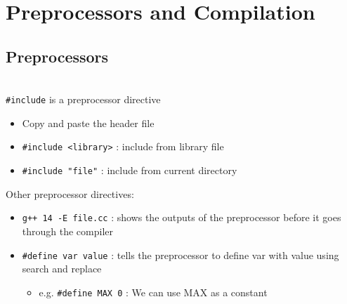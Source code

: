 \documentclass[12pt]{article}
\begin{document}
\section{Preprocessors and Compilation}
\subsection{Preprocessors}
\\
\lstinline{#include} is a preprocessor directive
\begin{itemize}
    \item Copy and paste the header file
    \item \lstinline{#include <library>} : include from library file
    \item \lstinline{#include "file"} : include from current directory
\end{itemize} 
Other preprocessor directives:
\begin{itemize}
    \item \lstinline{g++ 14 -E file.cc} : shows the outputs of the preprocessor before it goes through the compiler
    \item \lstinline{#define var value} : tells the preprocessor to define var with value using search and replace
        \begin{itemize}
            \item e.g. \lstinline{#define MAX 0} : We can use MAX as a constant
        \end{itemize}
\end{itemize}
\end{document}
